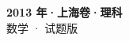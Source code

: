 \documentclass[zihao=-4, a4paper]{ctexart}
\begin{document}
\begin{center}
  {\Large\bfseries 2013 年·上海卷·理科}\\[4pt]
  {\large 数学 · 试题版}
\end{center}
\medskip
{}

\end{document}
